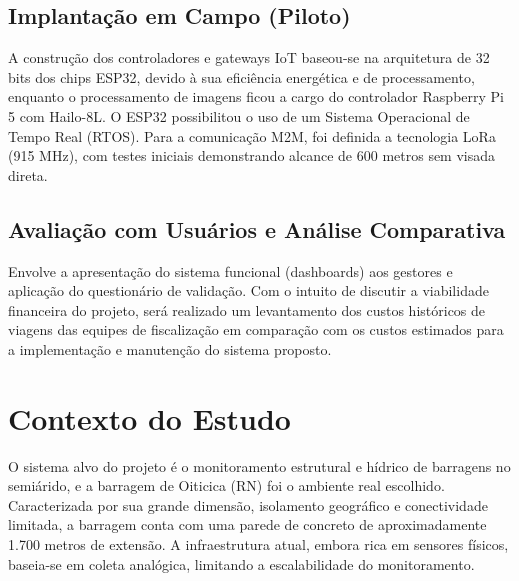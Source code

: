 \subsection{Implantação em Campo (Piloto)}
A construção dos controladores e gateways IoT baseou-se na arquitetura de 32 bits dos chips ESP32, devido à sua eficiência energética e de processamento, enquanto o processamento de imagens ficou a cargo do controlador Raspberry Pi 5 com Hailo-8L. O ESP32 possibilitou o uso de um Sistema Operacional de Tempo Real (RTOS). Para a comunicação M2M, foi definida a tecnologia LoRa (915 MHz), com testes iniciais demonstrando alcance de 600 metros sem visada direta.

\subsection{Avaliação com Usuários e Análise Comparativa}
Envolve a apresentação do sistema funcional (dashboards) aos gestores e aplicação do questionário de validação. Com o intuito de discutir a viabilidade financeira do projeto, será realizado um levantamento dos custos históricos de viagens das equipes de fiscalização em comparação com os custos estimados para a implementação e manutenção do sistema proposto.

\section{Contexto do Estudo}
O sistema alvo do projeto é o monitoramento estrutural e hídrico de barragens no semiárido, e a barragem de Oiticica (RN) foi o ambiente real escolhido. Caracterizada por sua grande dimensão, isolamento geográfico e conectividade limitada, a barragem conta com uma parede de concreto de aproximadamente 1.700 metros de extensão. A infraestrutura atual, embora rica em sensores físicos, baseia-se em coleta analógica, limitando a escalabilidade do monitoramento.
